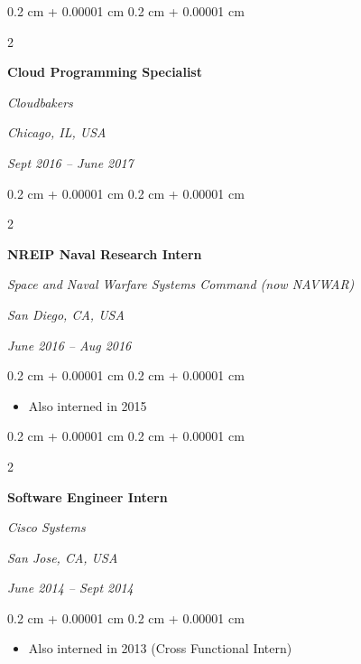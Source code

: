 \documentclass[10pt, letterpaper]{article}
\newenvironment{highlights}{
    \begin{itemize}[
        topsep=0.10 cm,
        parsep=0.10 cm,
        partopsep=0pt,
        itemsep=0pt,
        leftmargin=0.4 cm + 10pt
    ]
}{
    \end{itemize}
} %
\newenvironment{onecolentry}{
    \begin{adjustwidth}{
        0.2 cm + 0.00001 cm
    }{
        0.2 cm + 0.00001 cm
    }
}{
    \end{adjustwidth}
} %
\newenvironment{twocolentry}[2][]{
    \onecolentry
    \def\secondColumn{#2}
    \setcolumnwidth{\fill, 4.1 cm}
    \begin{paracol}{2}
}{
    \switchcolumn \raggedleft \secondColumn
    \end{paracol}
    \endonecolentry
} %
\begin{document}
        \begin{twocolentry}{
        \textit{Chicago, IL, USA}    
            
        \textit{Sept 2016 – June 2017}}
            \textbf{Cloud Programming Specialist}
            
            \textit{Cloudbakers}
        \end{twocolentry}



        \vspace{0.2 cm}

        \begin{twocolentry}{
        \textit{San Diego, CA, USA}    
            
        \textit{June 2016 – Aug 2016}}
            \textbf{NREIP Naval Research Intern}
            
            \textit{Space and Naval Warfare Systems Command (now NAVWAR)}
        \end{twocolentry}

        \vspace{0.10 cm}
        \begin{onecolentry}
            \begin{highlights}
                \item Also interned in 2015
            \end{highlights}
        \end{onecolentry}


        \vspace{0.2 cm}

        \begin{twocolentry}{
        \textit{San Jose, CA, USA}    
            
        \textit{June 2014 – Sept 2014}}
            \textbf{Software Engineer Intern}
            
            \textit{Cisco Systems}
        \end{twocolentry}

        \vspace{0.10 cm}
        \begin{onecolentry}
            \begin{highlights}
                \item Also interned in 2013 (Cross Functional Intern)
            \end{highlights}
        \end{onecolentry}
\end{document}
